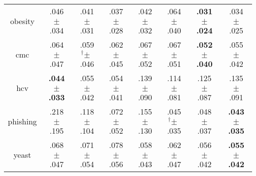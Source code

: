 \begin{tabular}{|c|ccccccc|}
obesity & .046$^{\phantom{\dag}}\pm^{\phantom{\dag}}$.034\cellcolor{green!3} & .041$^{\phantom{\dag}}\pm^{\phantom{\dag}}$.031\cellcolor{green!17} & .037$^{\phantom{\dag}}\pm^{\phantom{\dag}}$.028\cellcolor{green!26} & .042$^{\phantom{\dag}}\pm^{\phantom{\dag}}$.032\cellcolor{green!14} & .064$^{\phantom{\dag}}\pm^{\phantom{\dag}}$.040\cellcolor{red!40} & \textbf{.031$^{\phantom{\dag}}\pm^{\phantom{\dag}}$.024}\cellcolor{green!40} & .034$^{\phantom{\dag}}\pm^{\phantom{\dag}}$.025\cellcolor{green!33} \\
cmc & .064$^{\phantom{\dag}}\pm^{\phantom{\dag}}$.047\cellcolor{red!27} & .059$^{\dag}\pm^{\phantom{\dag}}$.046\cellcolor{green!1} & .062$^{\phantom{\dag}}\pm^{\phantom{\dag}}$.045\cellcolor{red!14} & .067$^{\phantom{\dag}}\pm^{\phantom{\dag}}$.052\cellcolor{red!39} & .067$^{\phantom{\dag}}\pm^{\phantom{\dag}}$.051\cellcolor{red!40} & \textbf{.052$^{\phantom{\dag}}\pm^{\phantom{\dag}}$.040}\cellcolor{green!40} & .055$^{\phantom{\dag}}\pm^{\phantom{\dag}}$.042\cellcolor{green!22} \\
hcv & \textbf{.044$^{\phantom{\dag}}\pm^{\phantom{\dag}}$.033}\cellcolor{green!40} & .055$^{\phantom{\dag}}\pm^{\phantom{\dag}}$.042\cellcolor{green!30} & .054$^{\phantom{\dag}}\pm^{\phantom{\dag}}$.041\cellcolor{green!31} & .139$^{\phantom{\dag}}\pm^{\phantom{\dag}}$.090\cellcolor{red!40} & .114$^{\phantom{\dag}}\pm^{\phantom{\dag}}$.081\cellcolor{red!18} & .125$^{\phantom{\dag}}\pm^{\phantom{\dag}}$.087\cellcolor{red!28} & .135$^{\phantom{\dag}}\pm^{\phantom{\dag}}$.091\cellcolor{red!36} \\
phishing & .218$^{\phantom{\dag}}\pm^{\phantom{\dag}}$.195\cellcolor{red!40} & .118$^{\phantom{\dag}}\pm^{\phantom{\dag}}$.104\cellcolor{green!5} & .072$^{\phantom{\dag}}\pm^{\phantom{\dag}}$.052\cellcolor{green!26} & .155$^{\phantom{\dag}}\pm^{\phantom{\dag}}$.130\cellcolor{red!11} & .045$^{\dag}\pm^{\phantom{\dag}}$.035\cellcolor{green!39} & .048$^{\phantom{\dag}}\pm^{\phantom{\dag}}$.037\cellcolor{green!37} & \textbf{.043$^{\phantom{\dag}}\pm^{\phantom{\dag}}$.035}\cellcolor{green!40} \\
yeast & .068$^{\phantom{\dag}}\pm^{\phantom{\dag}}$.047\cellcolor{red!4} & .071$^{\phantom{\dag}}\pm^{\phantom{\dag}}$.054\cellcolor{red!16} & .078$^{\phantom{\dag}}\pm^{\phantom{\dag}}$.056\cellcolor{red!40} & .058$^{\phantom{\dag}}\pm^{\phantom{\dag}}$.043\cellcolor{green!29} & .062$^{\phantom{\dag}}\pm^{\phantom{\dag}}$.047\cellcolor{green!16} & .056$^{\phantom{\dag}}\pm^{\phantom{\dag}}$.042\cellcolor{green!37} & \textbf{.055$^{\phantom{\dag}}\pm^{\phantom{\dag}}$.042}\cellcolor{green!40} \\

\end{tabular}
